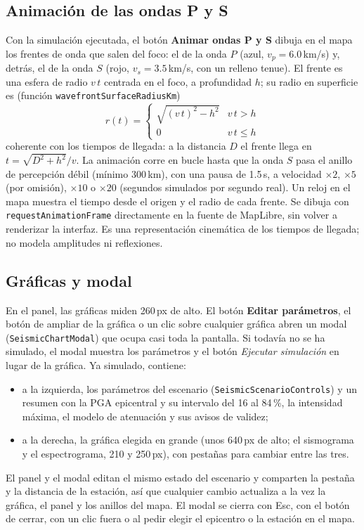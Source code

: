 \documentclass[11pt,a4paper]{article}
\begin{document}
\subsection{Animación de las ondas P y S}
Con la simulación ejecutada, el botón \textbf{Animar ondas P y S} dibuja en el mapa los frentes de
onda que salen del foco: el de la onda $P$ (azul, $v_p = 6.0$\,km/s) y, detrás, el de la onda $S$ (rojo,
$v_s = 3.5$\,km/s, con un relleno tenue). El frente es una esfera de radio $v\,t$ centrada en el foco, a
profundidad $h$; su radio en superficie es (función \texttt{wavefrontSurfaceRadiusKm})
\begin{equation}
  r(t) = \begin{cases} \sqrt{(v\,t)^2 - h^2} & v\,t > h\\ 0 & v\,t \le h \end{cases}
\end{equation}
coherente con los tiempos de llegada: a la distancia $D$ el frente llega en $t = \sqrt{D^2 + h^2}/v$.
La animación corre en bucle hasta que la onda $S$ pasa el anillo de percepción débil (mínimo 300\,km),
con una pausa de 1.5\,s, a velocidad $\times2$, $\times5$ (por omisión), $\times10$ o $\times20$ (segundos simulados por segundo
real). Un reloj en el mapa muestra el tiempo desde el origen y el radio de cada frente. Se dibuja con
\texttt{requestAnimationFrame} directamente en la fuente de MapLibre, sin volver a renderizar la
interfaz. Es una representación cinemática de los tiempos de llegada; no modela amplitudes ni
reflexiones.

\subsection{Gráficas y modal}
En el panel, las gráficas miden 260\,px de alto. El botón \textbf{Editar parámetros}, el botón de
ampliar de la gráfica o un clic sobre cualquier gráfica abren un modal (\texttt{SeismicChartModal})
que ocupa casi toda la pantalla. Si todavía no se ha simulado, el modal muestra los parámetros y el
botón \emph{Ejecutar simulación} en lugar de la gráfica. Ya simulado, contiene:
\begin{itemize}
  \item a la izquierda, los parámetros del escenario (\texttt{SeismicScenarioControls}) y un resumen con
        la PGA epicentral y su intervalo del 16 al 84\,\%, la intensidad máxima, el modelo de atenuación
        y sus avisos de validez;
  \item a la derecha, la gráfica elegida en grande (unos 640\,px de alto; el sismograma y el
        espectrograma, 210 y 250\,px), con pestañas para cambiar entre las tres.
\end{itemize}
El panel y el modal editan el mismo estado del escenario y comparten la pestaña y la distancia de la
estación, así que cualquier cambio actualiza a la vez la gráfica, el panel y los anillos del mapa. El
modal se cierra con Esc, con el botón de cerrar, con un clic fuera o al pedir elegir el epicentro o la
estación en el mapa.
\end{document}
